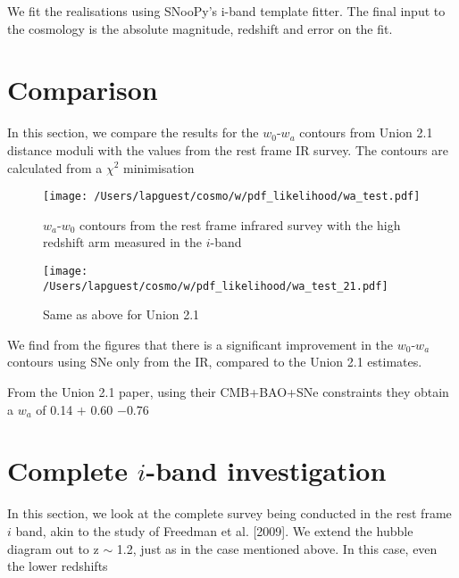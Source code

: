 \documentclass{article}
\begin{document}
We fit the realisations using SNooPy's i-band template fitter. The final input to the cosmology is the absolute magnitude, redshift and error on the fit. 


\section{Comparison}
In this section, we compare the results for the $w_0$-$w_a$ contours from Union 2.1 distance moduli with the values from the rest frame IR survey. 
The contours are calculated from a $\chi^2$ minimisation

\begin{figure}
\texttt{[image: /Users/lapguest/cosmo/w/pdf\_likelihood/wa\_test.pdf]}
\caption{$w_a$-$w_0$ contours from the rest frame infrared survey with the high redshift arm measured in the $i$-band}
\end{figure}

\begin{figure}
\texttt{[image: /Users/lapguest/cosmo/w/pdf\_likelihood/wa\_test\_21.pdf]}
\caption{Same as above for Union 2.1}
\end{figure}

We find from the figures that there is a significant improvement in the $w_0$-$w_a$ contours using SNe only from the IR, compared to the Union 2.1 estimates. 

From the Union 2.1 paper, using their CMB+BAO+SNe constraints they obtain a $w_a$ of 0.14 $+$ 0.60 $-$0.76

\section{Complete $i$-band investigation}
In this section, we look at the complete survey being conducted in the rest frame $i$ band, akin to the study of Freedman et al. [2009]. We extend the hubble diagram out to z $\sim$ 1.2, just as in the case mentioned above. In this case, even the lower redshifts 
\end{document}
